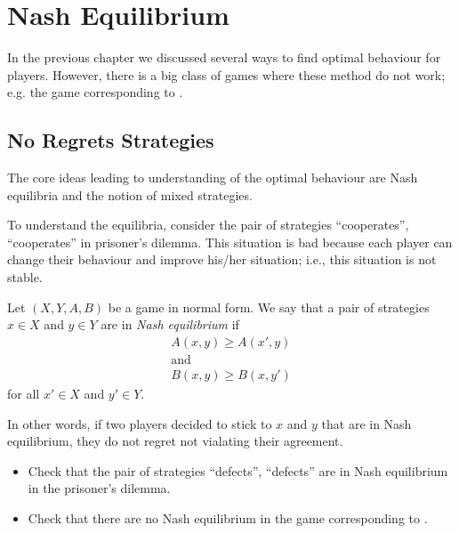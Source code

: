 \chapter{Nash Equilibrium}
In the previous chapter we discussed several ways to find optimal behaviour for
players. However, there is a big class of games where these method do not work;
e.g. the game corresponding to .


\section{No Regrets Strategies}
The core ideas leading to understanding of the optimal behaviour are Nash
equilibria and the notion of mixed strategies.

To understand the equilibria, consider the pair of strategies ``cooperates'',
``cooperates'' in prisoner's dilemma. This situation is bad because each player
can change their behaviour and improve his/her situation; i.e., this situation
is not stable.
\begin{definition}
  Let $(X, Y, A, B)$ be a game in normal form. We say that a pair of strategies
  $x \in X$ and $y \in Y$ are in \emph{Nash equilibrium} if 
  \begin{gather*}
    A(x, y) \ge A(x', y) \\
    \text{and} \\
    B(x, y) \ge B(x, y')
  \end{gather*}
  for all $x' \in X$ and $y' \in Y$.
\end{definition}
In other words, if two players decided to stick to $x$ and $y$ that are in Nash
equilibrium, they do not regret not vialating their agreement.
\begin{exercise}
  \begin{itemize}
    \item Check that the pair of strategies ``defects'', ``defects'' are in Nash
      equilibrium in the prisoner's dilemma.
    \item Check that there are no Nash equilibrium in the game corresponding to
      .
  \end{itemize}
\end{exercise}

